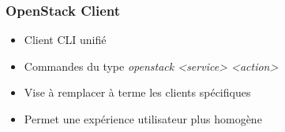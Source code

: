   \begin{frame}
    \frametitle{OpenStack Client}
    \begin{itemize}
      \item Client CLI unifié
      \item Commandes du type \textit{openstack <service> <action>}
      \item Vise à remplacer à terme les clients spécifiques
      \item Permet une expérience utilisateur plus homogène
    \end{itemize}
  \end{frame}
